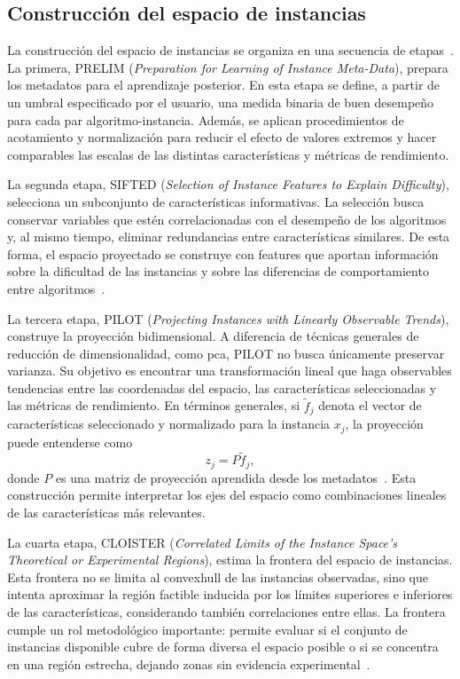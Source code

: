 \subsection{Construcción del espacio de instancias}
\label{subsec:isa_space_construction}

La construcción del espacio de instancias se organiza en una secuencia de
etapas~\parencite{smith-milesInstanceSpaceAnalysis2023a}. La primera,
PRELIM (\textit{Preparation for Learning of Instance Meta-Data}), prepara los metadatos para el
aprendizaje posterior. En esta etapa se define, a partir de un umbral especificado por el usuario,
una medida binaria de buen desempeño para cada par algoritmo-instancia. Además, se aplican
procedimientos de acotamiento y normalización para reducir el efecto de valores extremos y hacer
comparables las escalas de las distintas características y métricas de rendimiento.

La segunda etapa, SIFTED (\textit{Selection of Instance Features to Explain Difficulty}), selecciona
un subconjunto de características informativas. La selección busca conservar variables que estén
correlacionadas con el desempeño de los algoritmos y, al mismo tiempo, eliminar redundancias
entre características similares. De esta forma, el espacio proyectado se construye con features que
aportan información sobre la dificultad de las instancias y sobre las diferencias de comportamiento
entre algoritmos~\parencite{smith-milesInstanceSpaceAnalysis2023a}.

La tercera etapa, PILOT (\textit{Projecting Instances with Linearly Observable Trends}), construye
la proyección bidimensional. A diferencia de técnicas generales de reducción de dimensionalidad,
como \acrfull{pca}, PILOT no busca únicamente preservar varianza. Su objetivo es encontrar una
transformación lineal que haga observables tendencias entre las coordenadas del espacio, las
características seleccionadas y las métricas de rendimiento. En términos generales, si
$\tilde f_j$ denota el vector de características seleccionado y normalizado para la instancia $x_j$,
la proyección puede entenderse como
\[
    z_j = P\tilde f_j,
\]
donde $P$ es una matriz de proyección aprendida desde los
metadatos~\parencite{munozInstanceSpacesMachine2018a,smith-milesInstanceSpaceAnalysis2023a}. Esta construcción permite
interpretar los ejes del espacio como combinaciones lineales de las características más relevantes.

La cuarta etapa, CLOISTER (\textit{Correlated Limits of the Instance Space's Theoretical or
Experimental Regions}), estima la frontera del espacio de instancias. Esta frontera no se limita al
\gls{convexhull} de las instancias observadas, sino que intenta aproximar la región factible inducida por
los límites superiores e inferiores de las características, considerando también correlaciones entre
ellas. La frontera cumple un rol metodológico importante: permite evaluar si el conjunto de
instancias disponible cubre de forma diversa el espacio posible o si se concentra en una región
estrecha, dejando zonas sin evidencia experimental~\parencite{smith-milesInstanceSpaceAnalysis2023a}.

